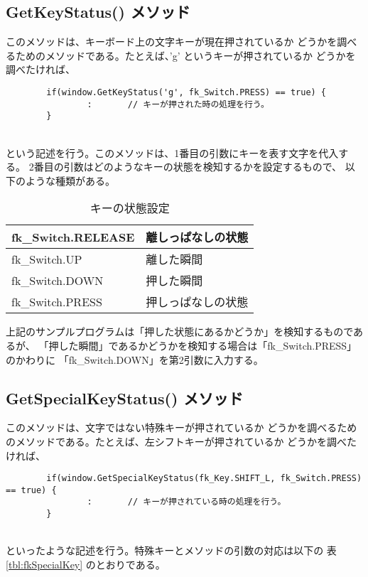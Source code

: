 \subsection{GetKeyStatus() メソッド}
このメソッドは、キーボード上の文字キーが現在押されているか
どうかを調べるためのメソッドである。たとえば、'g' というキーが押されているか
どうかを調べたければ、
\\
\begin{screen}
\begin{verbatim}
        if(window.GetKeyStatus('g', fk_Switch.PRESS) == true) {
                :       // キーが押された時の処理を行う。
        }
\end{verbatim}
\end{screen}
~ \\
という記述を行う。このメソッドは、1番目の引数にキーを表す文字を代入する。
2番目の引数はどのようなキーの状態を検知するかを設定するもので、
以下のような種類がある。

\begin{table}[H]
\caption{キーの状態設定}
\label{tbl:fkSwitch}
\begin{center}
\begin{tabular}{|l|l|}
\hline
fk\_Switch.RELEASE & 離しっぱなしの状態 \\ \hline
fk\_Switch.UP & 離した瞬間 \\ \hline
fk\_Switch.DOWN & 押した瞬間 \\ \hline
fk\_Switch.PRESS & 押しっぱなしの状態 \\ \hline
\end{tabular}
\end{center}
\end{table}

上記のサンプルプログラムは「押した状態にあるかどうか」を検知するものであるが、
「押した瞬間」であるかどうかを検知する場合は「fk\_Switch.PRESS」のかわりに
「fk\_Switch.DOWN」を第2引数に入力する。

\subsection{GetSpecialKeyStatus() メソッド}
このメソッドは、文字ではない特殊キーが押されているか
どうかを調べるためのメソッドである。たとえば、左シフトキーが押されているか
どうかを調べたければ、
\\
\begin{screen}
\begin{verbatim}
        if(window.GetSpecialKeyStatus(fk_Key.SHIFT_L, fk_Switch.PRESS) == true) {
                :       // キーが押されている時の処理を行う。
        }
\end{verbatim}
\end{screen}
~ \\
といったような記述を行う。特殊キーとメソッドの引数の対応は以下の
表 \ref{tbl:fkSpecialKey} のとおりである。

